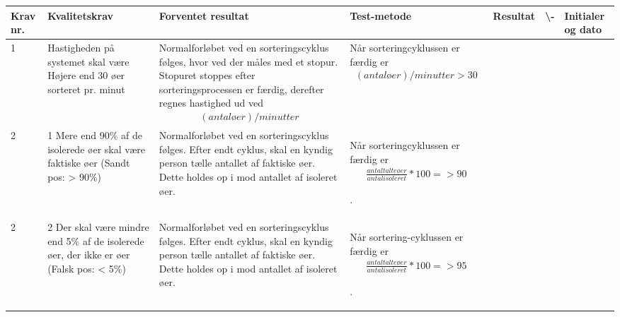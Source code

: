\begin{center}
		\begin{longtable}{ | m{1.785cm} | m{1.785cm}| m{1.785cm}| m{1.785cm}| m{1.785cm}| m{1.785cm}|m{1.785cm}| } 
			\hline
			\textbf{Krav nr.} &\textbf{ Kvalitetskrav} & \textbf{Forventet resultat} & \textbf{Test-metode} &\textbf{Resultat} & \textbf{ \checkmark \textbackslash -} & \textbf{Initialer og dato} \\ 
			
			\hline
			1 &  Hastigheden på systemet skal være Højere end 30 øer sorteret pr. minut & Normalforløbet ved en sorteringscyklus følges\fxnote{indsæt ref til UC}, hvor ved der måles med et stopur. Stopuret stoppes efter sorteringsprocessen er færdig, derefter regnes hastighed ud ved \begin{align}
			(antal øer)/minutter
			\end{align} \fxnote{hmm} & Når sorteringcyklussen er færdig er
			\begin{align}
			(antal øer)/minutter>30
			\end{align}
 &  & & \\
			\hline
			
			2 &  1 Mere end 90\% af de isolerede øer skal være faktiske øer 
(Sandt pos: > 90\%)
 & Normalforløbet ved en sorteringscyklus følges. Efter endt cyklus, skal en kyndig person tælle antallet af faktiske øer. Dette holdes op i mod antallet af isoleret øer. & Når sorteringcyklussen er færdig er
 \begin{align}
 \frac{antal talte øer}{antal isoleret}*100=>90
 \end{align}

.   &  & & \\
			\hline
			
			2 &  2 Der skal være mindre end 5\% af de isolerede øer, der ikke er øer
(Falsk pos: < 5\%)
 & Normalforløbet ved en sorteringscyklus følges. Efter endt cyklus, skal en kyndig person tælle antallet af faktiske øer. Dette holdes op i mod antallet af isoleret øer.  & Når sortering-cyklussen er færdig er
 \begin{align}
 \frac{antal talte øer}{antal isoleret}*100=>95
 \end{align}

.   &  & & \\


\end{longtable}
\end{center}
